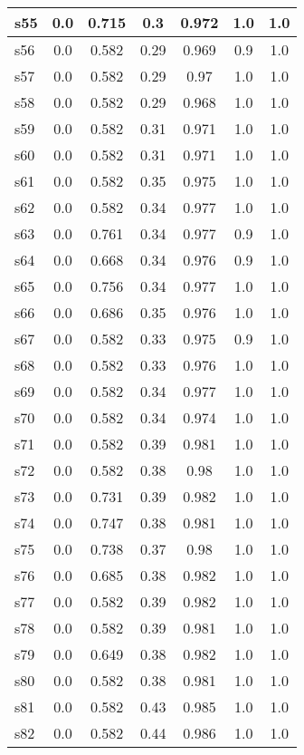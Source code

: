 \documentclass{article}
\begin{document}
\begin{tabular}{|l|c|c|c|c|c|c|}
s55 &0.0 & 0.715 & 0.3 & 0.972 & 1.0 & 1.0\\
\hline
s56 &0.0 & 0.582 & 0.29 & 0.969 & 0.9 & 1.0\\
\hline
s57 &0.0 & 0.582 & 0.29 & 0.97 & 1.0 & 1.0\\
\hline
s58 &0.0 & 0.582 & 0.29 & 0.968 & 1.0 & 1.0\\
\hline
s59 &0.0 & 0.582 & 0.31 & 0.971 & 1.0 & 1.0\\
\hline
s60 &0.0 & 0.582 & 0.31 & 0.971 & 1.0 & 1.0\\
\hline
s61 &0.0 & 0.582 & 0.35 & 0.975 & 1.0 & 1.0\\
\hline
s62 &0.0 & 0.582 & 0.34 & 0.977 & 1.0 & 1.0\\
\hline
s63 &0.0 & 0.761 & 0.34 & 0.977 & 0.9 & 1.0\\
\hline
s64 &0.0 & 0.668 & 0.34 & 0.976 & 0.9 & 1.0\\
\hline
s65 &0.0 & 0.756 & 0.34 & 0.977 & 1.0 & 1.0\\
\hline
s66 &0.0 & 0.686 & 0.35 & 0.976 & 1.0 & 1.0\\
\hline
s67 &0.0 & 0.582 & 0.33 & 0.975 & 0.9 & 1.0\\
\hline
s68 &0.0 & 0.582 & 0.33 & 0.976 & 1.0 & 1.0\\
\hline
s69 &0.0 & 0.582 & 0.34 & 0.977 & 1.0 & 1.0\\
\hline
s70 &0.0 & 0.582 & 0.34 & 0.974 & 1.0 & 1.0\\
\hline
s71 &0.0 & 0.582 & 0.39 & 0.981 & 1.0 & 1.0\\
\hline
s72 &0.0 & 0.582 & 0.38 & 0.98 & 1.0 & 1.0\\
\hline
s73 &0.0 & 0.731 & 0.39 & 0.982 & 1.0 & 1.0\\
\hline
s74 &0.0 & 0.747 & 0.38 & 0.981 & 1.0 & 1.0\\
\hline
s75 &0.0 & 0.738 & 0.37 & 0.98 & 1.0 & 1.0\\
\hline
s76 &0.0 & 0.685 & 0.38 & 0.982 & 1.0 & 1.0\\
\hline
s77 &0.0 & 0.582 & 0.39 & 0.982 & 1.0 & 1.0\\
\hline
s78 &0.0 & 0.582 & 0.39 & 0.981 & 1.0 & 1.0\\
\hline
s79 &0.0 & 0.649 & 0.38 & 0.982 & 1.0 & 1.0\\
\hline
s80 &0.0 & 0.582 & 0.38 & 0.981 & 1.0 & 1.0\\
\hline
s81 &0.0 & 0.582 & 0.43 & 0.985 & 1.0 & 1.0\\
\hline
s82 &0.0 & 0.582 & 0.44 & 0.986 & 1.0 & 1.0\\
\hline

\end{tabular}
\end{document}
